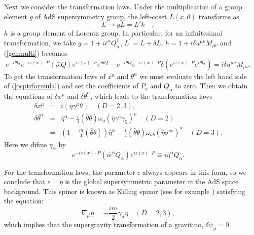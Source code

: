 \documentclass[a4paper,12pt]{article}
\def\btheta{\bar{\theta}}
\def\baeta{\bar{\eta}}
\def\bepsilon{\bar{\epsilon}}
\begin{document}
Next we consider the transformation laws. Under the
multiplication of a group element $g$ of AdS supersymmetry
group, the left-coset $L(x,\theta)$ transforms as \cite{Z}
\begin{equation}
 L \rightarrow gL=L'h \quad,
 \label{genmulti}
\end{equation}
$h$ is a group element of Lorentz group. 
In particular, for an infinitesimal transformation, we take $g = 1 +
i\bepsilon^{\alpha}Q^{1}_{\alpha}$, $L^{\prime} = L + \delta L$,
$h = 1 + i\delta u^{\mu\nu}M_{\mu\nu}$ and (\ref{genmulti}) becomes
\begin{equation}
 e^{-i\btheta Q}e^{-iz(x)\cdot P}(i\bepsilon Q)e^{iz(x)\cdot P}e^{i\btheta Q}
  - e^{-i\btheta Q}e^{-iz(x)\cdot P}\delta(e^{iz(x)\cdot P}e^{i\btheta Q}) 
  = i\delta u^{\mu\nu}M_{\mu\nu}.
  \label{osptrformula}
\end{equation}
To get the transformation laws of $x^{\mu}$ and $\theta^{\alpha}$
 we must evaluate the left hand side of (\ref{osptrformula})
and set the coefficients of $P_{a}$ and $Q_{\alpha}$ to zero.
Then we obtain the equations of $\delta x^{\mu}$ and 
$\delta \btheta^{\alpha}$, which leads to the transformation laws
\begin{eqnarray}
 \delta x^{\mu} &=& i(\baeta\gamma^{\mu}\theta)  \quad (D=2, 3), \nonumber \\
 \delta \btheta^{\alpha} &=& \baeta^{\alpha}
  - \frac{i}{4}(\btheta\theta)\omega_{a}
    (\baeta\gamma^{a}\gamma_{5})^{\alpha} \quad (D=2) \\
 &=& \left(1-\frac{m}{4}(\btheta\theta)\right) \baeta^{\alpha}
    - \frac{i}{4}(\btheta\theta)\omega_{ab}
             (\baeta\sigma^{ab})^{\alpha} \quad (D=3). \nonumber
\end{eqnarray}
Here we difine $\eta_{\alpha}$ by
\begin{equation}
e^{-iz(x)\cdot P}(i\bepsilon^{\alpha} Q_{\alpha})e^{iz(x)\cdot P}
	 \equiv i\baeta^{\alpha} Q_{\alpha}.
\end{equation}


For the transformation laws, the parameter $\epsilon$ always appears 
in this form, so we conclude that $\epsilon=\eta$ is the global
supersymmetric parameter in the AdS space background. 
This spinor 
is known as Killing spinor (see for example \cite{BF}) satisfying the
equation: 
\begin{equation}
 \nabla_{\mu}\eta = -\frac{im}{2}\gamma_{\mu}\eta \quad (D=2, 3),
  \label{killingeq}
\end{equation}
which implies that the supergravity transformation of a gravitino, 
$\delta \psi_{\mu} = 0$.
\end{document}
